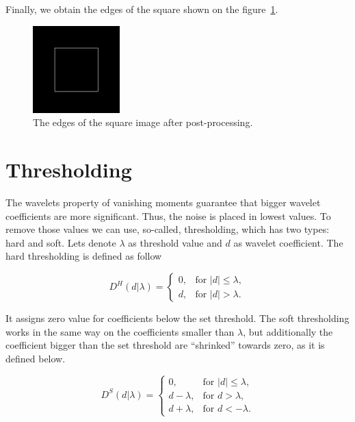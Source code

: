 Finally, we obtain the edges of the square shown on the figure~\ref{fig:square_idwt_pp}.

\begin{figure}[h]
	\centering
	\includegraphics[width=0.3\textwidth]{graphs/square_db2_pp.png}
	\caption{The edges of the square image after post-processing.}
	\label{fig:square_idwt_pp}
\end{figure}

\section{Thresholding}
\label{sec:threshold}

The wavelets property of vanishing moments guarantee that bigger wavelet coefficients are more significant. Thus, the noise is placed in lowest values. To remove those values we can use, so-called, thresholding, which has two types: hard and soft. Lets denote $\lambda$ as threshold value and $d$ as wavelet coefficient. The hard thresholding is defined as follow

\begin{equation}
D^H(d|\lambda)=
\begin{cases}
0, & \text{for } |d| \leq \lambda, \\
d, & \text{for } |d| > \lambda.
\end{cases}
\end{equation}

It assigns zero value for coefficients below the set threshold. The soft thresholding works in the same way on the coefficients smaller than $\lambda$, but additionally the coefficient bigger than the set threshold are ``shrinked'' towards zero, as it is defined below.

\begin{equation}
D^S(d|\lambda)=
\begin{cases}
	0, & \text{for } |d| \leq \lambda, \\
	d-\lambda, & \text{for } d > \lambda, \\
	d+\lambda, & \text{for } d < -\lambda.
\end{cases}
\end{equation}



